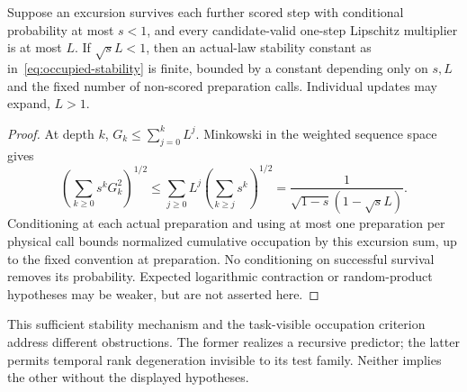 \begin{proposition}\label{prop:survival}
Suppose an excursion survives each further scored step with conditional probability at most $s<1$, and every candidate-valid one-step Lipschitz multiplier is at most $L$. If $\sqrt{s}L<1$, then an actual-law stability constant as in~\eqref{eq:occupied-stability} is finite, bounded by a constant depending only on $s,L$ and the fixed number of non-scored preparation calls. Individual updates may expand, $L>1$.
\end{proposition}
\begin{proof}
At depth $k$, $G_k\le\sum_{j=0}^kL^j$. Minkowski in the weighted sequence space gives
\[
 \left(\sum_{k\ge0}s^kG_k^2\right)^{1/2}
 \le\sum_{j\ge0}L^j\left(\sum_{k\ge j}s^k\right)^{1/2}
 =\frac1{\sqrt{1-s}(1-\sqrt{s}L)}.
\]
Conditioning at each actual preparation and using at most one preparation per physical call bounds normalized cumulative occupation by this excursion sum, up to the fixed convention at preparation. No conditioning on successful survival removes its probability. Expected logarithmic contraction or random-product hypotheses may be weaker, but are not asserted here.
\end{proof}
This sufficient stability mechanism and the task-visible occupation criterion address different obstructions. The former realizes a recursive predictor; the latter permits temporal rank degeneration invisible to its test family. Neither implies the other without the displayed hypotheses.
